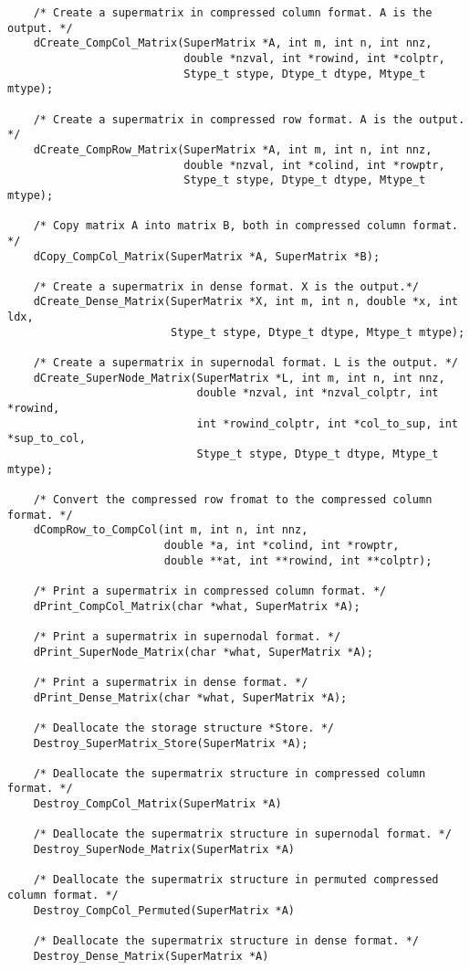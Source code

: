 \begin{verbatim}
    /* Create a supermatrix in compressed column format. A is the output. */
    dCreate_CompCol_Matrix(SuperMatrix *A, int m, int n, int nnz, 
                           double *nzval, int *rowind, int *colptr,
                           Stype_t stype, Dtype_t dtype, Mtype_t mtype);

    /* Create a supermatrix in compressed row format. A is the output. */
    dCreate_CompRow_Matrix(SuperMatrix *A, int m, int n, int nnz, 
                           double *nzval, int *colind, int *rowptr,
                           Stype_t stype, Dtype_t dtype, Mtype_t mtype);

    /* Copy matrix A into matrix B, both in compressed column format. */
    dCopy_CompCol_Matrix(SuperMatrix *A, SuperMatrix *B);

    /* Create a supermatrix in dense format. X is the output.*/
    dCreate_Dense_Matrix(SuperMatrix *X, int m, int n, double *x, int ldx,
                         Stype_t stype, Dtype_t dtype, Mtype_t mtype);

    /* Create a supermatrix in supernodal format. L is the output. */
    dCreate_SuperNode_Matrix(SuperMatrix *L, int m, int n, int nnz, 
                             double *nzval, int *nzval_colptr, int *rowind,
                             int *rowind_colptr, int *col_to_sup, int *sup_to_col,
                             Stype_t stype, Dtype_t dtype, Mtype_t mtype);

    /* Convert the compressed row fromat to the compressed column format. */
    dCompRow_to_CompCol(int m, int n, int nnz, 
                        double *a, int *colind, int *rowptr,
                        double **at, int **rowind, int **colptr);

    /* Print a supermatrix in compressed column format. */
    dPrint_CompCol_Matrix(char *what, SuperMatrix *A);

    /* Print a supermatrix in supernodal format. */
    dPrint_SuperNode_Matrix(char *what, SuperMatrix *A);

    /* Print a supermatrix in dense format. */
    dPrint_Dense_Matrix(char *what, SuperMatrix *A);

    /* Deallocate the storage structure *Store. */
    Destroy_SuperMatrix_Store(SuperMatrix *A);

    /* Deallocate the supermatrix structure in compressed column format. */
    Destroy_CompCol_Matrix(SuperMatrix *A)

    /* Deallocate the supermatrix structure in supernodal format. */
    Destroy_SuperNode_Matrix(SuperMatrix *A)

    /* Deallocate the supermatrix structure in permuted compressed column format. */
    Destroy_CompCol_Permuted(SuperMatrix *A)

    /* Deallocate the supermatrix structure in dense format. */
    Destroy_Dense_Matrix(SuperMatrix *A)
\end{verbatim}

